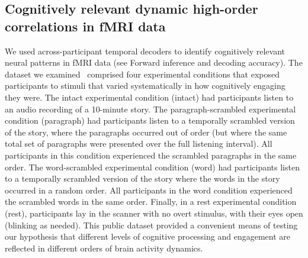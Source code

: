 \documentclass[english]{article}
\begin{document}
\subsection*{Cognitively relevant dynamic high-order correlations in
  fMRI data}
We used across-participant temporal decoders to identify cognitively
relevant neural patterns in fMRI data (see Forward inference
  and decoding accuracy).  The dataset we examined~\cite{SimoEtal16} comprised four experimental conditions that exposed
participants to stimuli that varied systematically in how cognitively
engaging they were.  The intact experimental condition (intact) had
participants listen to an audio recording of a 10-minute story.  The
paragraph-scrambled experimental condition (paragraph) had participants
listen to a temporally scrambled version of the story, where the
paragraphs occurred out of order (but where the same total set of
paragraphs were presented over the full listening interval).  All
participants in this condition experienced the scrambled paragraphs in
the same order.  The word-scrambled experimental condition (word)
had participants listen to a temporally scrambled version of the story
where the words in the story occurred in a random order.  All
participants in the word condition experienced the scrambled words in
the same order.  Finally, in a rest experimental condition (rest),
participants lay in the scanner with no overt stimulus, with their
eyes open (blinking as needed).  This public dataset provided a convenient
means of testing our hypothesis that different levels of cognitive
processing and engagement are reflected in different orders of brain
activity dynamics.
\end{document}
